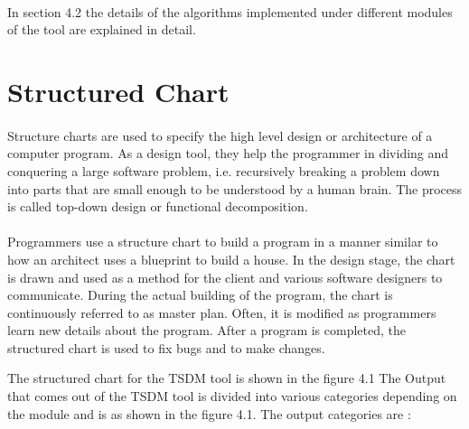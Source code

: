 \documentclass[12pt,a4paper]{report}
\begin{document}
\paragraph{}
In section 4.2 the details of the algorithms implemented under different modules of the tool are explained in detail.

\section{Structured Chart}
\paragraph{}Structure charts are used to specify the high level design or architecture of a computer program. As a design tool, they help the programmer in dividing and conquering a large software problem, i.e. recursively breaking a problem down into parts that are small enough to be understood by a human brain. The process is called top-down design or functional decomposition. 
\paragraph{}Programmers use a structure chart to build a program in a manner similar to how an architect uses a blueprint to build a house. In the design stage, the chart is drawn and used as a method for the client and various software designers to communicate. During the actual building of the program, the chart is continuously referred to as master plan. Often, it is modified as programmers learn new details about the program. After a program is completed, the structured chart is used to fix bugs and to make changes.


The structured chart for the TSDM tool is shown in the figure 4.1 The Output that comes out of the TSDM tool is divided into various categories depending on the module and is as shown in the figure 4.1.
The output categories are :
\end{document}

